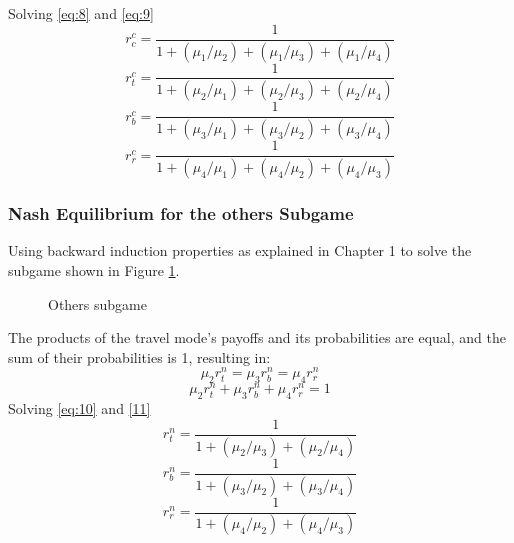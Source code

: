 Solving \ref{eq:8} and \ref{eq:9}
\begin{equation}\label{eq:5555}
r^c_{c} = \frac{1}{1+ (\mu_1 / \mu_2)+(\mu_1 / \mu_3)+(\mu_1 / \mu_4)}
\end{equation}
\begin{equation}
r^c_{t} = \frac{1}{1+ (\mu_2 / \mu_1)+(\mu_2 / \mu_3)+(\mu_2 / \mu_4)}
\end{equation}
\begin{equation}
r^c_{b} = \frac{1}{1+ (\mu_3 / \mu_1)+(\mu_3 / \mu_2)+(\mu_3 / \mu_4)}
\end{equation}
\begin{equation}
r^c_{r} = \frac{1}{1+ (\mu_4 / \mu_1)+(\mu_4 / \mu_2)+(\mu_4 / \mu_3)}
\end{equation}

\subsubsection{Nash Equilibrium for the others Subgame}
Using backward induction properties as explained in Chapter 1 to solve the subgame shown in Figure \ref{fig:4}. \\

\begin{figure}[!h]
  \centering
  \caption{Others subgame\label{fig:4}}
\end{figure}
The products of the travel mode's payoffs and its probabilities are equal, and the sum of their probabilities is 1, resulting in: 
\begin{equation}\label{eq:10}
\mu_2 r^n_{t} = \mu_3 r^n_{b} = \mu_4 r^n_{r}
\end{equation}
\begin{equation}\label{11}
\mu_2 r^n_{t} + \mu_3 r^n_{b} + \mu_4 r^n_{r} = 1
\end{equation}
Solving \ref{eq:10} and \ref{11} 
\begin{equation}
r^n_{t} = \frac{1}{1+(\mu_2 / \mu_3)+(\mu_2 / \mu_4)}
\end{equation}
\begin{equation}
r^n_{b} = \frac{1}{1+ (\mu_3 / \mu_2)+(\mu_3 / \mu_4)}
\end{equation}
\begin{equation}\label{eq:666}
r^n_{r} = \frac{1}{1+ (\mu_4 / \mu_2)+(\mu_4 / \mu_3)}
\end{equation}
